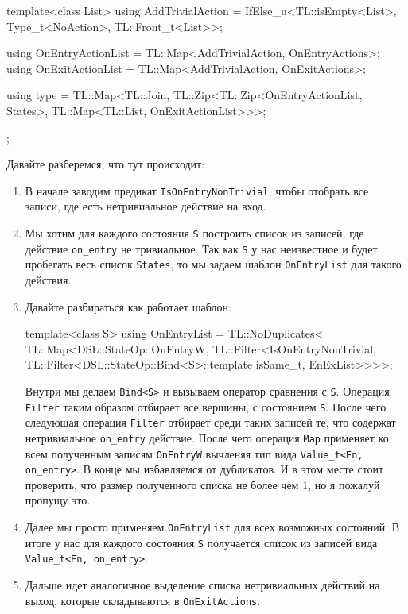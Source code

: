 \documentclass{article}
\begin{document}
{\begin{cppcode}
{  template<class List>
  using AddTrivialAction = IfElse_u<TL::isEmpty<List>, Type_t<NoAction>, TL::Front_t<List>>;
  
  using OnEntryActionList = TL::Map<AddTrivialAction, OnEntryActions>;
  using OnExitActionList = TL::Map<AddTrivialAction, OnExitActions>;
  
  using type = TL::Map<TL::Join, TL::Zip<TL::Zip<OnEntryActionList, States>,
                                         TL::Map<TL::List, OnExitActionList>>>;
};
\end{cppcode}
Давайте разберемся, что тут происходит:
\begin{enumerate}
\item В начале заводим предикат \verb"IsOnEntryNonTrivial", чтобы отобрать все записи, где есть нетривиальное действие на вход.

\item Мы хотим для каждого состояния \verb"S" построить список из записей, где действие \verb"on_entry" не тривиальное.
Так как \verb"S" у нас неизвестное и будет пробегать весь список \verb"States", то мы задаем шаблон \verb"OnEntryList" для такого действия.

\item Давайте разбираться как работает шаблон:
\begin{cppcode}[\nonumbers]
template<class S>
using OnEntryList = TL::NoDuplicates<
    TL::Map<DSL::StateOp::OnEntryW,
            TL::Filter<IsOnEntryNonTrivial,
                       TL::Filter<DSL::StateOp::Bind<S>::template isSame_t, EnExList>>>>;
\end{cppcode}
Внутри мы делаем \verb"Bind<S>" и вызываем оператор сравнения с \verb"S".
Операция \verb"Filter" таким образом отбирает все вершины, с состоянием \verb"S".
После чего следующая операция \verb"Filter" отбирает среди таких записей те, что содержат нетривиальное \verb"on_entry" действие.
После чего операция \verb"Map" применяет ко всем полученным записям \verb"OnEntryW" вычленяя тип вида \verb"Value_t<En, on_entry>".
В конце мы избавляемся от дубликатов.
И в этом месте стоит проверить, что размер полученного списка не более чем $1$, но я пожалуй пропущу это.

\item Далее мы просто применяем \verb"OnEntryList" для всех возможных состояний.
В итоге у нас для каждого состояния \verb"S" получается список из записей вида
\verb"Value_t<En, on_entry>".

\item Дальше идет аналогичное выделение списка нетривиальных действий на выход, которые складываются в \verb"OnExitActions".


\end{enumerate}}
\end{document}
